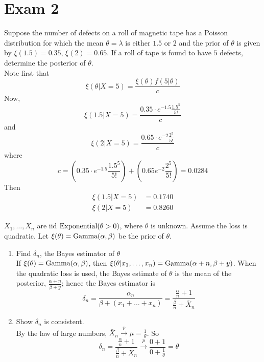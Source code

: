 \documentclass[12pt]{article}
\begin{document}
\section{Exam 2}
\begin{question} Suppose the number of defects on a roll of magnetic tape has a Poisson distribution for which the mean $\theta = \lambda$ is either $1.5$ or $2$ and the prior of $\theta$ is given by $\xi(1.5) = 0.35$, $\xi(2) = 0.65$. If a roll of tape is found to have $5$ defects, determine the posterior of $\theta$.  \\
Note first that $$ \xi(\theta | X = 5) = \frac{\xi(\theta) f(5|\theta)}{c} $$ 
Now, $$ \xi(1.5 | X = 5) = \frac{0.35 \cdot e^{-1.5} \frac{1.5^5}{5!}}{c}$$ 
and $$ \xi(2 | X=5) = \frac{0.65 \cdot e^{-2} \frac{2^5}{5!}}{c} $$ 
where $$ c = (0.35 \cdot e^{-1.5} \frac{1.5^5}{5!}) + (0.65e^{-2} \frac{2^5}{5!}) = 0.0284 $$ Then $$ \begin{aligned} \xi(1.5|X=5) &= 0.1740 \\ \xi(2 | X=5) &= 0.8260 \end{aligned} $$ 
\end{question} 

\begin{question} $X_1,\dots,X_n$ are iid $\text{Exponential}( \theta > 0 )$, where $\theta$ is unknown. Assume the loss is quadratic. Let $\xi(\theta) = \text{Gamma}( \alpha,\beta )$ be the prior of $\theta$. 
\begin{enumerate} 
\item Find $\delta_n$, the Bayes estimator of $\theta$ \\
If $\xi(\theta) = \text{Gamma}( \alpha,\beta )$, then $\xi(\theta | x_1,\dots,x_n) = \text{Gamma}( \alpha+n,\beta+y )$. When the quadratic loss is used, the Bayes estimate of $\theta$ is the mean of the posterior, $\frac{\alpha+n}{\beta+y}$; hence the Bayes estimator is $$ \delta_n = \frac{\alpha_n}{\beta + (x_1 + \dots + x_n)} = \frac{ \frac{\alpha}{n} + 1}{\frac{\beta}{n} + \bar{X}_n} $$ 
\item Show $\delta_n$ is consistent. \\
By the law of large numbers, $\bar{X}_n \stackrel{p}{\to} \mu = \frac{1}{\theta}$. So
$$ \delta_n = \frac{ \frac{\alpha}{n} + 1}{\frac{\beta}{n} + \bar{X}_n} \stackrel{p}{\to} \frac{0+1}{0 + \frac{1}{\theta}} = \theta $$ 
\end{enumerate} 
\end{question} 
\end{document}
